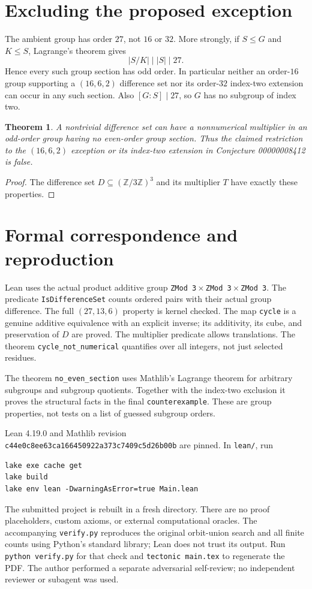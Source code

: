 \documentclass[11pt]{article}
\newtheorem{theorem}{Theorem}
\newcommand{\Z}{\mathbb Z}
\begin{document}
\section*{Excluding the proposed exception}
The ambient group has order $27$, not $16$ or $32$. More strongly,
if $S\le G$ and $K\le S$, Lagrange's theorem gives
\[
 |S/K|\mid |S|\mid27.
\]
Hence every such group section has odd order. In particular neither
an order-$16$ group supporting a $(16,6,2)$ difference set nor its
order-$32$ index-two extension can occur in any such section.
Also $[G:S]\mid27$, so $G$ has no subgroup of index two.

\begin{theorem}
A nontrivial difference set can have a nonnumerical multiplier in
an odd-order group having no even-order group section. Thus the
claimed restriction to the $(16,6,2)$ exception or its index-two
extension in Conjecture 00000008412 is false.
\end{theorem}
\begin{proof}
The difference set $D\subseteq(\Z/3\Z)^3$ and its multiplier $T$
have exactly these properties.
\end{proof}

\section*{Formal correspondence and reproduction}
Lean uses the actual product additive group
\texttt{ZMod 3}\,$\times$\,\texttt{ZMod 3}\,$\times$\,\texttt{ZMod 3}.
The predicate \texttt{IsDifferenceSet} counts ordered pairs with
their actual group difference. The full $(27,13,6)$ property is
kernel checked. The map \texttt{cycle} is a genuine additive
equivalence with an explicit inverse; its additivity, its cube,
and preservation of $D$ are proved. The multiplier predicate allows
translations. The theorem \texttt{cycle\_not\_numerical} quantifies
over all integers, not just selected residues.

The theorem \texttt{no\_even\_section} uses Mathlib's Lagrange theorem
for arbitrary subgroups and subgroup quotients. Together with the
index-two exclusion it proves the structural facts in the final
\texttt{counterexample}. These are group properties, not tests on
a list of guessed subgroup orders.

Lean 4.19.0 and Mathlib revision\\
\texttt{c44e0c8ee63ca166450922a373c7409c5d26b00b}
are pinned. In \texttt{lean/}, run
\begin{verbatim}
lake exe cache get
lake build
lake env lean -DwarningAsError=true Main.lean
\end{verbatim}
The submitted project is rebuilt in a fresh directory. There are
no proof placeholders, custom axioms, or external computational
oracles. The accompanying \texttt{verify.py} reproduces the original
orbit-union search and all finite counts using Python's standard
library; Lean does not trust its output. Run \texttt{python verify.py}
for that check and \texttt{tectonic main.tex} to regenerate the PDF.
The author performed a separate adversarial self-review; no
independent reviewer or subagent was used.
\end{document}
